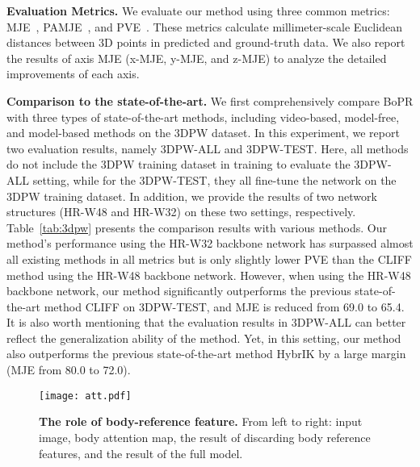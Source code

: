 \documentclass[10pt,twocolumn,letterpaper]{article}
\begin{document}
\noindent\textbf{Evaluation Metrics.}
We evaluate our method using three common metrics: MJE~\cite{ionescu2013human3}, PAMJE~\cite{gower1975generalized}, and PVE~\cite{pavlakos2018learning}. These metrics calculate millimeter-scale Euclidean distances between 3D points in predicted and ground-truth data. We also report the results of axis MJE (x-MJE, y-MJE, and z-MJE) to analyze the detailed improvements of each axis.












\noindent\textbf{Comparison to the state-of-the-art.}
We first comprehensively compare BoPR with three types of state-of-the-art methods, including video-based, model-free, and model-based methods on the 3DPW dataset. In this experiment, we report two evaluation results, namely 3DPW-ALL and 3DPW-TEST. Here,  all methods do not include the 3DPW training dataset in training to evaluate the 3DPW-ALL setting, while for the 3DPW-TEST, they all fine-tune the network on the 3DPW training dataset. In addition, we provide the results of two network structures (HR-W48 and HR-W32) on these two settings, respectively. Table~\ref{tab:3dpw} presents the comparison results with various methods. Our method's performance using the HR-W32 backbone network has surpassed almost all existing methods in all metrics but is only slightly lower PVE than the CLIFF method using the HR-W48 backbone network. However, when using the HR-W48 backbone network, our method significantly outperforms the previous state-of-the-art method CLIFF on 3DPW-TEST, and MJE is reduced from 69.0 to 65.4. It is also worth mentioning that the evaluation results in 3DPW-ALL can better reflect the generalization ability of the method. Yet, in this setting, our method also outperforms the previous state-of-the-art method HybrIK by a large margin (MJE from 80.0 to 72.0).



\begin{figure}
  \centering
  \texttt{[image: att.pdf]}
  \caption{\noindent\textbf{The role of body-reference feature.} From left to right: input image, body attention map, the result of discarding body reference features, and the result of the full model.}
  \label{fig:att}
\end{figure}
\end{document}
